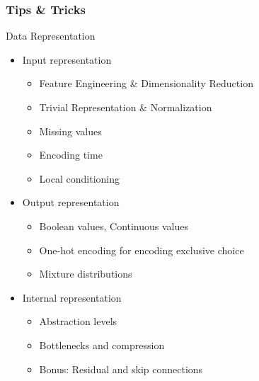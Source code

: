 \documentclass[8pt]{beamer}
\begin{document}
\begin{frame}
\frametitle{Tips \& Tricks}
 \begin{block}{Data Representation}
  \begin{itemize}
   \item Input representation
   \begin{itemize}
    \item Feature Engineering \& Dimensionality Reduction
    \item Trivial Representation \& Normalization
    \item Missing values
    \item Encoding time
    \item Local conditioning
   \end{itemize}
   \item Output representation
   \begin{itemize}
    \item Boolean values, Continuous values
    \item One-hot encoding for encoding exclusive choice
    \item Mixture distributions
   \end{itemize}
   \item Internal representation
   \begin{itemize}
    \item Abstraction levels
    \item Bottlenecks and compression
    \item Bonus: Residual and skip connections
   \end{itemize}
  \end{itemize}
 \end{block}
\end{frame}
\end{document}
